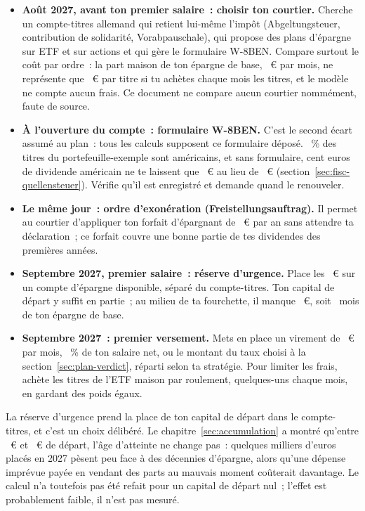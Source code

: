 \begin{itemize}
  \item \textbf{Ao\^ut 2027, avant ton premier salaire~: choisir ton courtier.} Cherche un compte-titres
  allemand qui retient lui-m\^eme l'imp\^ot (Abgeltungsteuer, contribution de solidarit\'e,
  Vorabpauschale), qui propose des plans d'\'epargne sur ETF et sur actions et qui g\`ere le
  formulaire W-8BEN. Compare surtout le co\^ut par ordre~: la part maison de ton \'epargne de base,
  \EpargneMoisMaisonBasis~€ par mois, ne repr\'esente que \EpargneMoisParTitre~€ par titre si tu
  ach\`etes chaque mois les \NombreTitres{} titres, et le mod\`ele ne compte aucun frais. Ce document
  ne compare aucun courtier nomm\'ement, faute de source.
  \item \textbf{\`A l'ouverture du compte~: formulaire W-8BEN.} C'est le second \'ecart assum\'e au
  plan~: tous les calculs supposent ce formulaire d\'epos\'e. \PartUs~\% des titres du
  portefeuille-exemple sont am\'ericains, et sans formulaire, cent euros de dividende am\'ericain ne te
  laissent que \NettoUsSansFormulaire~€ au lieu de \NettoUs~€ (section~\ref{sec:fisc-quellensteuer}).
  V\'erifie qu'il est enregistr\'e et demande quand le renouveler.
  \item \textbf{Le m\^eme jour~: ordre d'exon\'eration (Freistellungsauftrag).} Il permet au courtier
  d'appliquer ton forfait d'\'epargnant de \Sparerpauschbetrag~€ par an sans
  attendre ta d\'eclaration~; ce forfait couvre une bonne partie de tes dividendes des premi\`eres
  ann\'ees.
  \item \textbf{Septembre 2027, premier salaire~: r\'eserve d'urgence.} Place les \ReserveUrgence~€ sur
  un compte d'\'epargne disponible, s\'epar\'e du compte-titres. Ton capital de d\'epart y suffit en
  partie~; au milieu de ta fourchette, il manque \ReserveUrgenceComplement~€, soit
  \ReserveUrgenceMoisComplement~mois de ton \'epargne de base.
  \item \textbf{Septembre 2027~: premier versement.} Mets en place un virement de
  \EpargneMoisBasis~€ par mois, \ReferenzSparquote~\% de ton salaire net, ou le montant du taux choisi
  \`a la section~\ref{sec:plan-verdict}, r\'eparti selon ta strat\'egie. Pour limiter les frais, ach\`ete
  les titres de l'ETF maison par roulement, quelques-uns chaque mois, en gardant des poids \'egaux.
\end{itemize}

La r\'eserve d'urgence prend la place de ton capital de d\'epart dans le compte-titres, et c'est un
choix d\'elib\'er\'e. Le chapitre~\ref{sec:accumulation} a montr\'e qu'entre \KapitalDepartNiedrig~€ et
\KapitalDepartHoch~€ de d\'epart, l'\^age d'atteinte ne change pas~: quelques milliers d'euros plac\'es
en 2027 p\`esent peu face \`a des d\'ecennies d'\'epargne, alors qu'une d\'epense impr\'evue pay\'ee en
vendant des parts au mauvais moment co\^uterait davantage. Le calcul n'a toutefois pas \'et\'e refait
pour un capital de d\'epart nul~; l'effet est probablement faible, il n'est pas mesur\'e.

